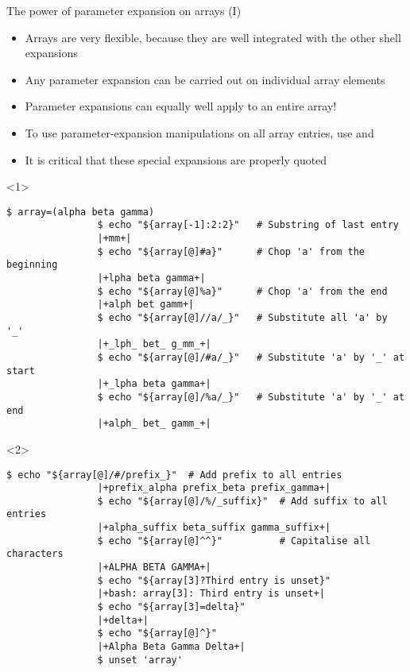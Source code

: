 \begin{frame}[fragile]{The power of parameter expansion on arrays (I)}
    \vspace{-2mm}
    \begin{overlayarea}{\textwidth}{0.7\textheight}
         \begin{itemize}
             \item Arrays are very flexible, because they are well integrated with the other shell expansions
             \item Any parameter expansion can be carried out on individual array elements
             \item Parameter expansions can equally well apply to an entire array!
             \item To use parameter-expansion manipulations on all array entries, use \PB{\texttt{[@]}} and \PB{\texttt{[*]}}
             \item It is critical that these special expansions are properly quoted
         \end{itemize}
        \begin{onlyenv}<1>
            \begin{lstlisting}[style=MyBash, aboveskip=2mm, xrightmargin=3mm]
                $ array=(alpha beta gamma)
                $ echo "${array[-1]:2:2}"   # Substring of last entry
                |+mm+|
                $ echo "${array[@]#a}"      # Chop 'a' from the beginning
                |+lpha beta gamma+|
                $ echo "${array[@]%a}"      # Chop 'a' from the end
                |+alph bet gamm+|
                $ echo "${array[@]//a/_}"   # Substitute all 'a' by '_'
                |+_lph_ bet_ g_mm_+|
                $ echo "${array[@]/#a/_}"   # Substitute 'a' by '_' at start
                |+_lpha beta gamma+|
                $ echo "${array[@]/%a/_}"   # Substitute 'a' by '_' at end
                |+alph_ bet_ gamm_+|
            \end{lstlisting}
        \end{onlyenv}
        \begin{onlyenv}<2>
            \begin{lstlisting}[style=MyBash, aboveskip=2mm, xrightmargin=3mm, firstnumber=14]
                $ echo "${array[@]/#/prefix_}"  # Add prefix to all entries
                |+prefix_alpha prefix_beta prefix_gamma+|
                $ echo "${array[@]/%/_suffix}"  # Add suffix to all entries
                |+alpha_suffix beta_suffix gamma_suffix+|
                $ echo "${array[@]^^}"          # Capitalise all characters
                |+ALPHA BETA GAMMA+|
                $ echo "${array[3]?Third entry is unset}"
                |+bash: array[3]: Third entry is unset+|
                $ echo "${array[3]=delta}"
                |+delta+|
                $ echo "${array[@]^}"
                |+Alpha Beta Gamma Delta+|
                $ unset 'array'
            \end{lstlisting}
        \end{onlyenv}
    \end{overlayarea}
\end{frame}
